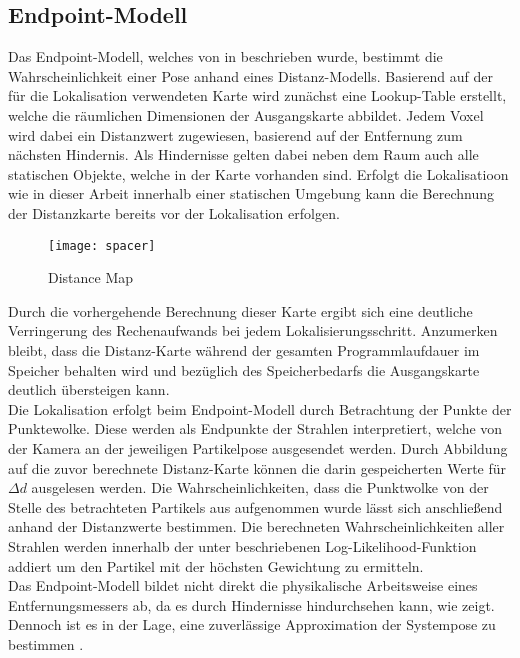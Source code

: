 
\subsection{Endpoint-Modell}
Das Endpoint-Modell, welches von \red[X] in \cite{Endpoint} beschrieben wurde, bestimmt die Wahrscheinlichkeit einer Pose anhand eines Distanz-Modells. Basierend auf der für die Lokalisation verwendeten Karte wird zunächst eine Lookup-Table erstellt, welche die räumlichen Dimensionen der Ausgangskarte abbildet. Jedem Voxel wird dabei ein Distanzwert zugewiesen, basierend auf der Entfernung zum nächsten Hindernis. Als Hindernisse gelten dabei neben dem Raum auch alle statischen Objekte, welche in der Karte vorhanden sind. Erfolgt die Lokalisatioon wie in dieser Arbeit innerhalb einer statischen Umgebung kann die Berechnung der Distanzkarte bereits vor der Lokalisation erfolgen.\\

\begin{figure}[!ht]
	\begin{center}
		\texttt{[image: spacer]}
		\caption{Distance Map}
		\label{fig.dist_map}
	\end{center}
\end{figure}

Durch die vorhergehende Berechnung dieser Karte ergibt sich eine deutliche Verringerung des Rechenaufwands bei jedem Lokalisierungsschritt. Anzumerken bleibt, dass die Distanz-Karte während der gesamten Programmlaufdauer im Speicher behalten wird und bezüglich des Speicherbedarfs die Ausgangskarte deutlich übersteigen kann.\\
Die Lokalisation erfolgt beim Endpoint-Modell durch Betrachtung der Punkte der Punktewolke. Diese werden als Endpunkte der Strahlen interpretiert, welche von der Kamera an der jeweiligen Partikelpose ausgesendet werden. Durch Abbildung auf die zuvor berechnete Distanz-Karte können die darin gespeicherten Werte für $\Delta d$ ausgelesen werden. Die Wahrscheinlichkeiten, dass die Punktwolke von der Stelle des betrachteten Partikels aus aufgenommen wurde lässt sich anschließend anhand der Distanzwerte bestimmen. Die berechneten Wahrscheinlichkeiten aller Strahlen werden innerhalb der unter  beschriebenen Log-Likelihood-Funktion addiert um den Partikel mit der höchsten Gewichtung zu ermitteln.\\
Das Endpoint-Modell bildet nicht direkt die physikalische Arbeitsweise eines Entfernungsmessers ab, da es durch Hindernisse \glqq hindurchsehen\grqq{} kann, wie  zeigt. Dennoch ist es in der Lage, eine zuverlässige Approximation der Systempose zu bestimmen \cite{Konolige1999}.\\

